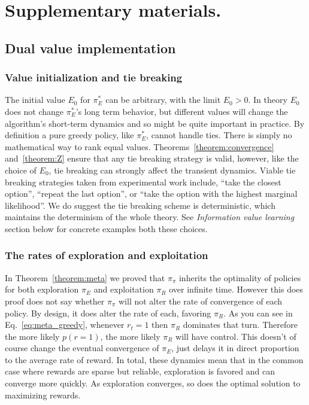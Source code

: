 \setcounter{figure}{0}   
\section*{Supplementary materials.}
\subsection*{Dual value implementation}
\subsubsection*{Value initialization and tie breaking} \label{sec:init_ties}
The initial value $E_0$ for $\pi^*_E$ can be arbitrary, with the limit $E_0 > 0$. In theory $E_0$ does not change $\pi^*_E$'s long term behavior, but different values will change the algorithm's short-term dynamics and so might be quite important in practice. By definition a pure greedy policy, like $\pi^*_E$, cannot handle ties. There is simply no mathematical way to rank equal values. Theorems~\ref{theorem:convergence} and~\ref{theorem:Z} ensure that any tie breaking strategy is valid, however, like the choice of $E_0$, tie breaking can strongly affect the transient dynamics. Viable tie breaking strategies taken from experimental work include, ``take the closest option'', ``repeat the last option'', or ``take the option with the highest marginal likelihood''. We do suggest the tie breaking scheme is deterministic, which maintains the determinism of the whole theory. See \emph{Information value learning} section below for concrete examples both these choices.

\subsubsection*{The rates of exploration and exploitation}
In Theorem~\ref{theorem:meta} we proved that $\pi_{\pi}$ inherits the optimality of policies for both exploration $\pi_E$ and exploitation $\pi_R$ over infinite time. However this does proof does not say whether $\pi_{\pi}$ will not alter the rate of convergence of each policy. By design, it does alter the rate of each, favoring $\pi_R$. As you can see in Eq.~\ref{eq:meta_greedy}, whenever $r_t = 1$ then $\pi_R$ dominates that turn. Therefore the more likely $p(r=1)$, the more likely $\pi_R$ will have control. This doesn't of course change the eventual convergence of $\pi_E$, just delays it in direct proportion to the average rate of reward. In total, these dynamics mean that in the common case where rewards are sparse but reliable, exploration is favored and can converge more quickly. As exploration converges, so does the optimal solution to maximizing rewards.

